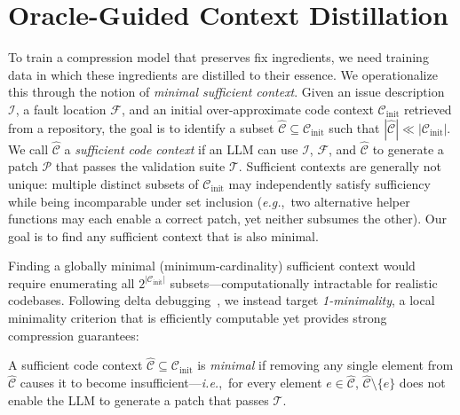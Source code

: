 \documentclass[sigconf,nonacm]{acmart}
\newcommand{\ie}{\textit{i.e.},~}
\newcommand{\eg}{\textit{e.g.},~}
\newcommand{\projName}{\textsc{SWEzze}\xspace}
\begin{document}

\section{Oracle-Guided Context Distillation}
\label{sec:ocd}

To train a compression model that preserves fix ingredients, we need training data in which these ingredients are distilled to their essence. We operationalize this through the notion of \emph{minimal sufficient context}. Given an issue description $\mathcal{I}$, a fault location $\mathcal{F}$, and an initial over-approximate code context $\mathcal{C}_\mathrm{init}$ retrieved from a repository, the goal is to identify a subset $\hat{\mathcal{C}} \subseteq \mathcal{C}_\mathrm{init}$ such that $|\hat{\mathcal{C}}| \ll |\mathcal{C}_\mathrm{init}|$. We call $\hat{\mathcal{C}}$ a \textit{sufficient code context} if an LLM can use $\mathcal{I}$, $\mathcal{F}$, and $\hat{\mathcal{C}}$ to generate a patch $\mathcal{P}$ that passes the validation suite $\mathcal{T}$. Sufficient contexts are generally not unique: multiple distinct subsets of $\mathcal{C}_\mathrm{init}$ may independently satisfy sufficiency while being incomparable under set inclusion (\eg two alternative helper functions may each enable a correct patch, yet neither subsumes the other). Our goal is to find any sufficient context that is also minimal.

Finding a globally minimal (minimum-cardinality) sufficient context would require enumerating all $2^{|\mathcal{C}_\mathrm{init}|}$ subsets---computationally intractable for realistic codebases. Following delta debugging~\cite{zeller2002simplifying}, we instead target \textit{1-minimality}, a local minimality criterion that is efficiently computable yet provides strong compression guarantees:

\begin{definition}
A sufficient code context $\hat{\mathcal{C}} \subseteq \mathcal{C}_\mathrm{init}$ is \textit{minimal} if removing any single element from $\hat{\mathcal{C}}$ causes it to become insufficient---\ie for every element $e \in \hat{\mathcal{C}}$, $\hat{\mathcal{C}} \setminus \{e\}$ does not enable the LLM to generate a patch that passes $\mathcal{T}$.
\end{definition}
\end{document}
